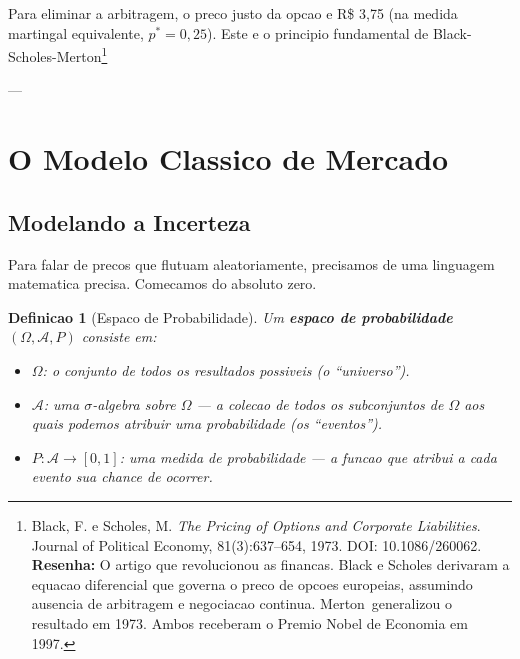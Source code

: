 \documentclass[12pt,a4paper]{article}
\newtheorem{defi}[teo]{Definicao}
\theoremstyle{remark}
\begin{document}
Para eliminar a arbitragem, o preco justo da opcao e R\$ 3,75 (na medida
martingal equivalente, $p^* = 0,25$). Este e o principio fundamental de
Black-Scholes-Merton\footnote{Black, F. e Scholes, M. \textit{The Pricing of
Options and Corporate Liabilities}. Journal of Political Economy, 81(3):637--654,
1973. DOI: 10.1086/260062. \textbf{Resenha:} O artigo que revolucionou as
financas. Black e Scholes derivaram a equacao diferencial que governa o preco
de opcoes europeias, assumindo ausencia de arbitragem e negociacao continua.
Merton\footnotemark\ generalizou o resultado em 1973. Ambos
receberam o Premio Nobel de Economia em 1997.}

---

\section{O Modelo Classico de Mercado}

\subsection{Modelando a Incerteza}

Para falar de precos que flutuam aleatoriamente, precisamos de uma linguagem
matematica precisa. Comecamos do absoluto zero.

\begin{defi}[Espaco de Probabilidade]
Um \textbf{espaco de probabilidade} $(\Omega, \mathcal{A}, P)$ consiste em:
\begin{itemize}[nosep]
  \item $\Omega$: o conjunto de todos os resultados possiveis (o
        ``universo'').
  \item $\mathcal{A}$: uma $\sigma$-algebra sobre $\Omega$ — a colecao de
        todos os subconjuntos de $\Omega$ aos quais podemos atribuir uma
        probabilidade (os ``eventos'').
  \item $P: \mathcal{A} \to [0,1]$: uma medida de probabilidade — a funcao
        que atribui a cada evento sua chance de ocorrer.
\end{itemize}
\end{defi}
\end{document}
